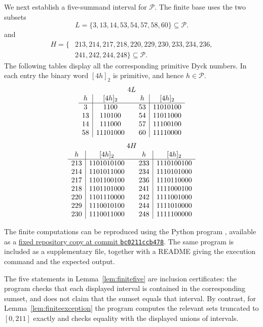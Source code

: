 \documentclass[12pt]{article}
\theoremstyle{plain}
\theoremstyle{definition}
\theoremstyle{plain}
\newcommand{\Pset}{\mathcal{P}}
\begin{document}
We next establish a five-summand interval for $\Pset$.  The finite base
uses the two subsets
\begin{equation}\label{eq:L-def}
 L=\{3,13,14,53,54,57,58,60\}\subseteq\Pset.
\end{equation}
and
\begin{equation}\label{eq:H-def}
\begin{split}
 H=\{&213,214,217,218,220,229,230,233,234,236,\\
     &241,242,244,248\}\subseteq\Pset.
\end{split}
\end{equation}
The following tables display all the corresponding primitive Dyck
numbers.  In each entry the binary word $[4h]_2$ is primitive, and hence
$h\in\Pset$.
\[
\begin{array}{c|c@{\qquad}c|c}
\multicolumn{4}{c}{4L}\\
h&[4h]_2&h&[4h]_2\\ \hline
3&1100&53&11010100\\
13&110100&54&11011000\\
14&111000&57&11100100\\
58&11101000&60&11110000
\end{array}
\]
\[
\begin{array}{c|c@{\qquad}c|c}
\multicolumn{4}{c}{4H}\\
h&[4h]_2&h&[4h]_2\\ \hline
213&1101010100&233&1110100100\\
214&1101011000&234&1110101000\\
217&1101100100&236&1110110000\\
218&1101101000&241&1111000100\\
220&1101110000&242&1111001000\\
229&1110010100&244&1111010000\\
230&1110011000&248&1111100000
\end{array}
\]

The finite computations can be reproduced using the Python program
, available as a
\href{https://github.com/growupkuriyama-hub/lean_cfg_project/blob/bc0211ccb478d79969f8ce6b5fe465e5f3fd9cf5/LeanCfgProject/PrimDyck/verify_certificates_for_paper.py}{fixed repository copy at commit \texttt{bc0211ccb478}}.
The same program is included as a supplementary file, together with a
README giving the execution command and the expected output.

The five statements in Lemma~\ref{lem:finitefive} are inclusion
certificates: the program checks that each displayed interval is
contained in the corresponding sumset, and does not claim that the
sumset equals that interval.  By contrast, for
Lemma~\ref{lem:finiteexception} the program computes the relevant sets
truncated to $[0,211]$ exactly and checks equality with the displayed
unions of intervals.
\end{document}
